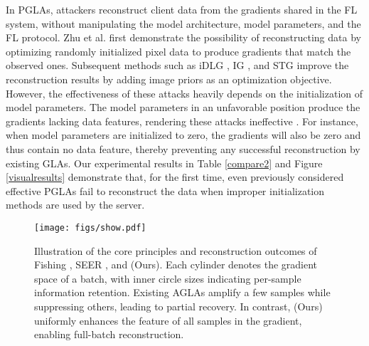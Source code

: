 In PGLAs, attackers reconstruct client data from the gradients shared in the FL system, without manipulating the model architecture, model parameters, and the FL protocol. Zhu et al. \cite{zhu2019deep} first demonstrate the possibility of reconstructing data by optimizing randomly initialized pixel data to produce gradients that match the observed ones. Subsequent methods such as iDLG \cite{zhao2020idlg}, IG \cite{geiping2020inverting}, and STG \cite{yin2021see} improve the reconstruction results by adding image priors as an optimization objective.
However, the effectiveness of these attacks heavily depends on the initialization of model parameters. The model parameters in an unfavorable position produce the gradients lacking data features, rendering these attacks ineffective \cite{du2024sok}. For instance, when model parameters are initialized to zero, the gradients will also be zero and thus contain no data feature, thereby preventing any successful reconstruction by existing GLAs. Our experimental results in Table \ref{compare2} and Figure \ref{visualresults} demonstrate that, for the first time, even previously considered effective PGLAs fail to reconstruct the data when improper initialization methods are used by the server. 
\begin{figure}[t]
    \centering
    \vspace{0.1cm}  %
    \texttt{[image: figs/show.pdf]}
    \caption{Illustration of the core principles and reconstruction outcomes of Fishing \cite{wen2022fishing}, SEER \cite{Garov2024Hiding}, and \name (Ours). Each cylinder denotes the gradient space of a batch, with inner circle sizes indicating per-sample information retention. Existing AGLAs amplify a few samples while suppressing others, leading to partial recovery. In contrast, \name (Ours) uniformly enhances the feature of all samples in the gradient, enabling full-batch reconstruction.
    }
    \label{showdiff}
\end{figure}

